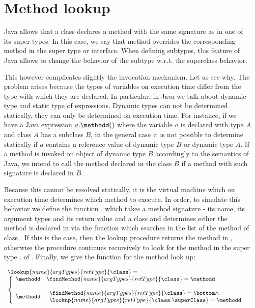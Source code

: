 \index{\lookupOnly}
\section{Method lookup}

Java allows that a class   declares a method \methodd{} with the same signature as in one of its super types.
In this case, we say that method \methodd{}  overrides the corresponding method in the super type or interface.
When defining subtypes, this feature of Java allows to change the behavior of the subtype
 w.r.t. the superclass behavior.

This however complicates slightly the invocation mechanism. Let us see why.
 The problem arises because the types of variables  on execution time differ from the type 
with which they are declared. In particular, in Java we talk about  dynamic type and static type of expressions.
Dynamic types can not be determined statically, they can only be determined on execution time.
For instance, if we have a Java expression 
$a.\methodd()$ where  the variable $a$ is declared with type $A$ and class $A$ has a subclass $B$,
 in the general case it is not possible  to determine statically if $a$ contains 
a reference value of dynamic type $B$ or dynamic type $A$.
 If a method  \methodd{} is invoked on object of dynamic type $B$
accordingly to the semantics of Java, we intend to call the method declared in the class $B$ if a method with such signature is declared in $B$.


Because this cannot be resolved statically,  it is the virtual machine which on execution time determines which method to execute. 
 In order, to simulate this behavior we define the function \lookupOnly, which takes a method signature - its name, its argument types and its return value
 and a class \class{} and determines either the method is declared
in \class{} via the function \findMethodOnly{} which searches in the list of the method of class \class. If this is the case, then the lookup procedure returns the method in \class, otherwise the procedure continues recursively
to look for the method in the super type \class.\superClass{} of \class. Finally, we give the function for the method look up:

$$\begin{array}{l}
\lookup{name}{ argTypes}{retType }{\class} = \\
       \left\{\begin{array}{ll}
             \methodd & \findMethod{name}{ argTypes} {retType}{\class} = \methodd \\
	              & \\
	     \methodd &    \begin{array}{l}
                                  \findMethod{name}{ argTypes} {retType}{\class} = \bottom \wedge \\
				  \lookup{name}{ argTypes} {retType}{\class.\superClass} = \methodd
			\end{array}	  
       \end{array}\right.
\end{array}$$
